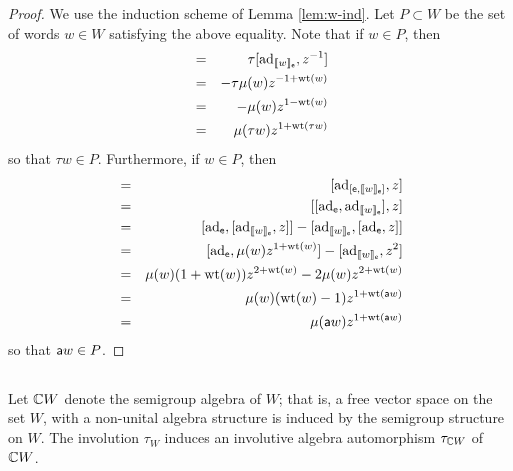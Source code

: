 \begin{proof}
        We use the induction scheme of Lemma \ref{lem:w-ind}. Let $P\subset W$ be the set of words $w \in W$
        satisfying 
the above equality. Note that if $w \in P$, then
\begin{eqnarray*}
        [ \ad_{\bkt{\tau w}_\e}, z ] &=& \tau [ \ad_{\bkt{w}_\e}, z^{-1} ] \\
                                     &=& -\tau \mu(w) z^{-1+\wt(w)} \\
                                     &=& -\mu(w) z^{1-\wt(w)} \\
                                     &=& \mu(\tau w) z^{1+\wt(\tau w)}
\end{eqnarray*}
so that $\tau w \in P$. Furthermore, if $w \in P$, then
\begin{eqnarray*}
 [ \ad_{\bkt{\a w}_\e}, z] &=& [ \ad_{[ \e, \bkt{w}_\e ]}, z ] \\
                           &=& [ [ \ad_\e, \ad_{\bkt{w}_\e} ], z] \\
                           &=& [ \ad_\e, [\ad_{\bkt{w}_\e}, z]] - [\ad_{\bkt{w}_\e}, [\ad_\e,z]] \\
                           &=& [ \ad_\e, \mu(w) z^{1+\wt(w)} ] - [ \ad_{\bkt{w}_\e}, z^2 ] \\
                           &=& \mu(w) (1+\wt(w)) z^{2+\wt(w)} - 2 \mu(w) z^{2+\wt(w)} \\
                           &=& \mu(w) (\wt(w)-1) z^{1+\wt(\a w)} \\
                           &=& \mu(\a w) z^{1 + \wt(\a w)}
\end{eqnarray*}
so that $\mathsf{a} w \in P$. 
\end{proof}
 
\subsection{}
Let ${{\mathbb{C}}{}W}$ denote the semigroup algebra of $W$; that is, a free vector space on the set $W$,
with a non-unital algebra structure is induced by the semigroup structure on $W$. The involution 
$\tau_W$ induces an involutive algebra automorphism $\tau_{{\mathbb{C}}{}W}$ of ${{\mathbb{C}}{}W}$.

